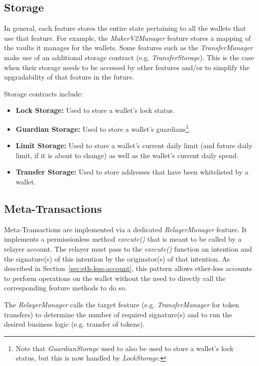 \documentclass[12pt]{article}
\begin{document}
\subsection{Storage}
\label{sec:storage}
In general, each feature stores the entire state pertaining to all the wallets that use that feature. For example, the \emph{MakerV2Manager} feature stores a mapping of the vaults it manages for the wallets. Some features such as the \emph{TransferManager} make use of an additional storage contract (e.g. \emph{TransferStorage}). This is the case when their storage needs to be accessed by other features and/or to simplify the upgradability of that feature in the future.

Storage contracts include:
\begin{itemize}
\item \textbf{Lock Storage:} Used to store a wallet's lock status.
\item \textbf{Guardian Storage:} Used to store a wallet's guardians\footnote{Note that \emph{GuardianStorage} used to also be used to store a wallet's lock status, but this is now handled by \emph{LockStorage}.}.
\item \textbf{Limit Storage:} Used to store a wallet's current daily limit (and future daily limit, if it is about to change) as well as the wallet's current daily spend.
\item \textbf{Transfer Storage:} Used to store addresses that have been whitelisted by a wallet.
\end{itemize}

\subsection{Meta-Transactions}
\label{sec:meta-transactions}
Meta-Transactions are implemented via a dedicated \emph{RelayerManager} feature. It implements a permissionless method \emph{execute()} that is meant to be called by a relayer account. The relayer must pass to the \emph{execute()} function an intention and the signature(s) of this intention by the originator(s) of that intention. As described in Section~\ref{sec:eth-less-account}, this pattern allows ether-less accounts to perform operations on the wallet without the need to directly call the corresponding feature methods to do so.

The \emph{RelayerManager} calls the target feature (e.g. \emph{TransferManager} for token transfers) to determine the number of required signature(s) and to run the desired business logic (e.g. transfer of tokens).
\end{document}
